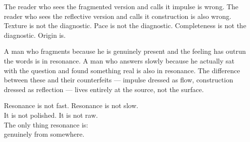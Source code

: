 The reader who sees the fragmented version and calls it impulse is wrong. The reader who sees the reflective version and calls it construction is also wrong. Texture is not the diagnostic. Pace is not the diagnostic. Completeness is not the diagnostic. Origin is.

A man who fragments because he is genuinely present and the feeling has outrun the words is in resonance. A man who answers slowly because he actually sat with the question and found something real is also in resonance. The difference between these and their counterfeits --- impulse dressed as flow, construction dressed as reflection --- lives entirely at the source, not the surface.

\begin{calloutbox}
Resonance is not fast. Resonance is not slow.\\
It is not polished. It is not raw.\\[0.4em]
The only thing resonance is:\\
genuinely from somewhere.
\end{calloutbox}